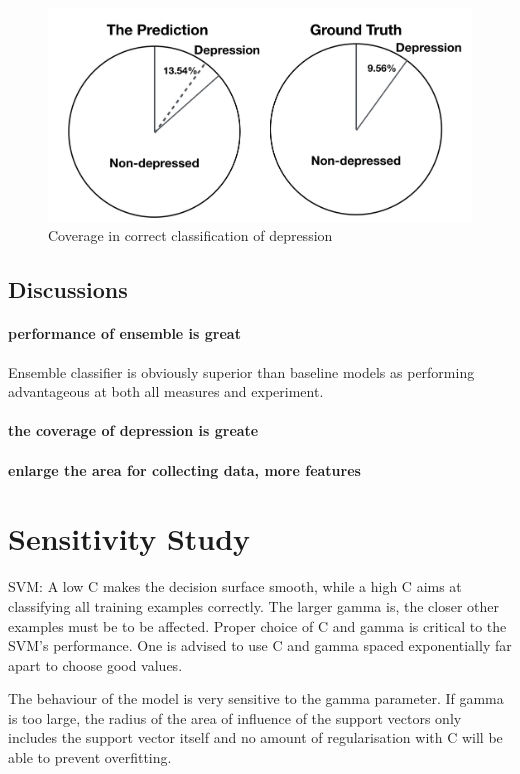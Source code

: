 \documentclass[runningheads]{llncs}
\begin{document}
\begin{figure}[h]
\includegraphics[width=1\textwidth]{coverage.png}
\caption{Coverage in correct classification of depression} \label{fig5}
\end{figure}
%
%
%
%
%
%
\subsection{Discussions}
\paragraph{performance of ensemble is great}
Ensemble classifier is obviously superior than baseline models as performing advantageous at both all measures and experiment. 
%
%
\paragraph{the coverage of depression is greate}
%
%
%
%
%
\paragraph{enlarge the area for collecting data, more features}
%
%
%
%
%
%
%
%
%
%
%
%
%
%
\pagebreak
\section{Sensitivity Study}
%
%
%
SVM: 
A low C makes the decision surface smooth, while a high C aims at classifying all training examples correctly.
The larger gamma is, the closer other examples must be to be affected.
Proper choice of C and gamma is critical to the SVM’s performance. One is advised to use C and gamma spaced exponentially far apart to choose good values.

The behaviour of the model is very sensitive to the gamma parameter. If gamma is too large, the radius of the area of influence of the support vectors only includes the support vector itself and no amount of regularisation with C will be able to prevent overfitting.
\end{document}
